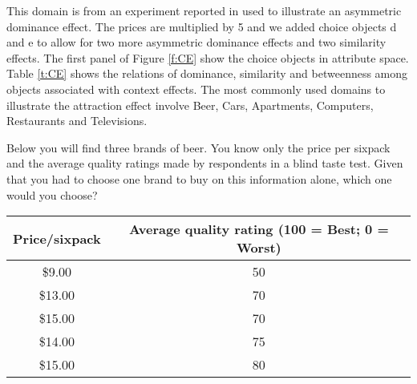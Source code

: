 
This domain is from an experiment reported in  used to illustrate an asymmetric dominance effect.
The prices are multiplied by 5 and we added choice objects d and e to allow for two more asymmetric dominance effects and two similarity effects.
The first panel of Figure \ref{f:CE} show the choice objects in attribute space.
Table \ref{t:CE} shows the relations of dominance, similarity and betweenness among objects associated with context effects.
The most commonly used domains to illustrate the attraction effect involve Beer, Cars, Apartments, Computers, Restaurants and Televisions.

\begin{tcolorbox}
Below you will find three brands of beer.
You know only the price per sixpack and the average quality ratings made by respondents in a blind taste test.
Given that you had to choose one brand to buy on this information alone, which one would you choose?

\begin{tabular}{cc}
\hline
Price/sixpack & Average quality rating (100 = Best; 0 = Worst) \\ 
\hline
\$9.00 & 50 \\ 
\$13.00 & 70 \\ 
\$15.00 & 70 \\ 
\$14.00 & 75 \\ 
\$15.00 & 80 \\ \hline
\end{tabular}
\end{tcolorbox}
